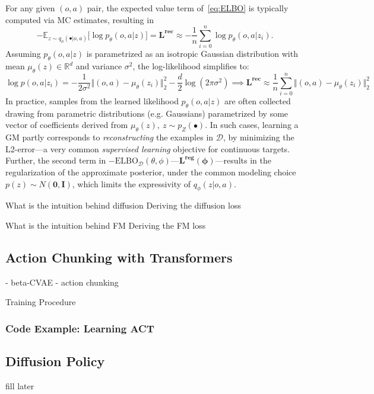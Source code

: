 For any given \((o,a) \) pair, the expected value term of~\ref{eq:ELBO} is typically computed via MC estimates, resulting in
\[ 
-\mathbb{E}_{z \sim q_\phi(\bullet \vert o,a)} \big[ \log p_\theta(o,a \vert z) \big] = \mathbf{L^{\text{rec}}} \approx - \frac{1}{n} \sum_{i=0}^n \log p_\theta(o,a \vert z_i).
\]
Assuming \( p_\theta(o,a \vert z) \) is parametrized as an isotropic Gaussian distribution with mean \(\mu_\theta (z) \in \mathbb R^d \) and variance \( \sigma^2 \), the log-likelihood simplifies to:
\[
\log p(o,a \vert z_i) = -\frac{1}{2\sigma^{2}} \big \Vert (o,a)-\mu_\theta(z_i) \big\Vert_2^2 -\frac{d}{2}\log(2\pi \sigma^{2}) \implies \mathbf{L^\text{rec}} \approx \frac {1}{n} \sum_{i=0}^n \big\Vert (o,a) - \mu_\theta(z_i) \big \Vert^2_2
\]
In practice, samples from the learned likelihood \( p_\theta(o,a \vert z) \) are often collected drawing from parametric distributions (e.g. Gaussians) parametrized by some vector of coefficients derived from \(\mu_\theta (z), \ z \sim p_Z (\bullet) \).
In such cases, learning a GM partly corresponds to \emph{reconstructing} the examples in \( \mathcal D \), by minimizing the L2-error---a very common \emph{supervised learning} objective for continuous targets.
Further, the second term in \( -\text{ELBO}_\mathcal D(\theta, \phi) \)---\( \mathbf{\mathbf{L^{\text{reg}}}(\phi)} \)---results in the regularization of the approximate posterior, under the common modeling choice \( p(z) \sim N(\mathbf{0}, \mathbf{I}) \), which limits the expressivity of \( q_\phi(z\vert o,a) \).

What is the intuition behind diffusion
Deriving the diffusion loss

What is the intuition behind FM
Deriving the FM loss

\subsection{Action Chunking with Transformers}
- beta-CVAE
- action chunking

Training Procedure

\subsubsection{Code Example: Learning ACT}

\subsection{Diffusion Policy}
fill later

